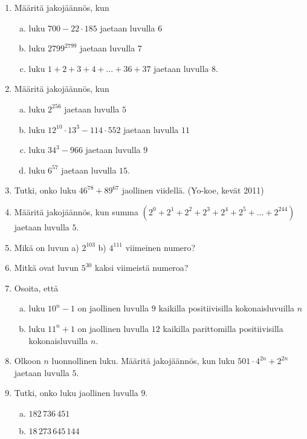 \begin{enumerate}

\item Määritä jakojäännös, kun
\begin{enumerate}[a)]
\item luku $700 - 22 \cdot 185$ jaetaan luvulla $6$
\item luku $2799^{2799}$ jaetaan luvulla $7$
\item luku $1+2+3+4+ \ldots + 36 + 37$ jaetaan luvulla $8$.
\end{enumerate}

\item Määritä jakojäännös, kun
\begin{enumerate}[a)]
\item luku $2^{256}$ jaetaan luvulla $5$
\item luku $12^{10} \cdot 13^{3} - 114 \cdot 552$ jaetaan luvulla $11$
\item luku $34^{3} - 966$ jaetaan luvulla $9$
\item luku $6^{57}$ jaetaan luvulla $15$.
\end{enumerate}


\item
Tutki, onko luku $46^{78} + 89^{67}$ jaollinen viidellä. (Yo-koe, kevät 2011)

\item Määritä jakojäännös, kun summa $(2^0 + 2^1 + 2^2 + 2^3 + 2^4 + 2^5 + \ldots + 2^{244})$ jaetaan luvulla $5$.

\item Mikä on luvun a) $2^{103}$  b) $4^{111}$ viimeinen numero?

\item Mitkä ovat luvun $5^{30}$ kaksi viimeistä numeroa?

\item Osoita, että
\begin{enumerate}[a)]
\item luku $10^n - 1$ on jaollinen luvulla $9$ kaikilla positiivisilla kokonaisluvuilla $n$
\item luku $11^n + 1$ on jaollinen luvulla $12$ kaikilla parittomilla positiivisilla kokonaisluvuilla $n$.
\end{enumerate}

\item Olkoon $n$ luonnollinen luku. Määritä jakojäännös, kun luku $501 \cdot 4^{2n} + 2^{2n}$ jaetaan luvulla $5$.

\item
Tutki, onko luku jaollinen luvulla $9$.
\begin{enumerate}[a)]
\item $182\, 736\, 451$
\item $18\, 273\, 645\, 144$
\end{enumerate}


\end{enumerate}
